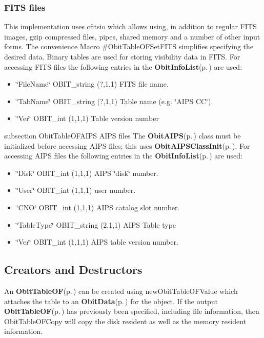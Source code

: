 \subsubsection{FITS files}\label{ObitTableWX_8h_TableFITS}
This implementation uses cfitsio which allows using, in addition to regular FITS images, gzip compressed files, pipes, shared memory and a number of other input forms. The convenience Macro \#Obit\-Table\-OFSet\-FITS simplifies specifying the desired data. Binary tables are used for storing visibility data in FITS. For accessing FITS files the following entries in the {\bf Obit\-Info\-List}{\rm (p.\,\pageref{structObitInfoList})} are used: \begin{itemize}
\item \char`\"{}File\-Name\char`\"{} OBIT\_\-string (?,1,1) FITS file name. \item \char`\"{}Tab\-Name\char`\"{} OBIT\_\-string (?,1,1) Table name (e.g. \char`\"{}AIPS CC\char`\"{}). \item \char`\"{}Ver\char`\"{} OBIT\_\-int (1,1,1) Table version number\end{itemize}
subsection Obit\-Table\-OFAIPS AIPS files The {\bf Obit\-AIPS}{\rm (p.\,\pageref{structObitAIPS})} class must be initialized before accessing AIPS files; this uses {\bf Obit\-AIPSClass\-Init}{\rm (p.\,\pageref{ObitAIPS_8c_a5})}. For accessing AIPS files the following entries in the {\bf Obit\-Info\-List}{\rm (p.\,\pageref{structObitInfoList})} are used: \begin{itemize}
\item \char`\"{}Disk\char`\"{} OBIT\_\-int (1,1,1) AIPS \char`\"{}disk\char`\"{} number. \item \char`\"{}User\char`\"{} OBIT\_\-int (1,1,1) user number. \item \char`\"{}CNO\char`\"{} OBIT\_\-int (1,1,1) AIPS catalog slot number. \item \char`\"{}Table\-Type\char`\"{} OBIT\_\-string (2,1,1) AIPS Table type \item \char`\"{}Ver\char`\"{} OBIT\_\-int (1,1,1) AIPS table version number.\end{itemize}
\subsection{Creators and Destructors}\label{ObitTableOF_8h_ObitTableOFaccess}
An {\bf Obit\-Table\-OF}{\rm (p.\,\pageref{structObitTableOF})} can be created using new\-Obit\-Table\-OFValue which attaches the table to an {\bf Obit\-Data}{\rm (p.\,\pageref{structObitData})} for the object. If the output {\bf Obit\-Table\-OF}{\rm (p.\,\pageref{structObitTableOF})} has previously been specified, including file information, then Obit\-Table\-OFCopy will copy the disk resident as well as the memory resident information.

